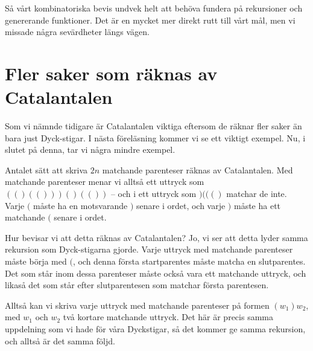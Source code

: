\documentclass{tufte-handout}
\begin{document}
Så vårt kombinatoriska bevis undvek helt att behöva fundera på rekursioner och genererande funktioner. Det är en mycket mer direkt rutt till vårt mål, men vi missade några sevärdheter längs vägen.

\section{Fler saker som räknas av Catalantalen}

Som vi nämnde tidigare är Catalantalen viktiga eftersom de räknar fler saker än bara just Dyck-stigar. I nästa föreläsning kommer vi se ett viktigt exempel. Nu, i slutet på denna, tar vi några mindre exempel.

\begin{example}
    Antalet sätt att skriva $2n$ matchande parenteser räknas av Catalantalen. Med matchande parenteser menar vi alltså ett uttryck som $(()(()))()(())$ -- och i ett uttryck som $)((()$ matchar de inte. Varje $($ måste ha en motsvarande $)$ senare i ordet, och varje $)$ måste ha ett matchande $($ senare i ordet.

    Hur bevisar vi att detta räknas av Catalantalen? Jo, vi ser att detta lyder samma rekursion som Dyck-stigarna gjorde. Varje uttryck med matchande parenteser måste börja med $($, och denna första startparentes måste matcha en slutparentes. Det som står inom dessa parenteser måste också vara ett matchande uttryck, och likaså det som står efter slutparentesen som matchar första parentesen.

    Alltså kan vi skriva varje uttryck med matchande parenteser på formen $(w_1)w_2$, med $w_1$ och $w_2$ två kortare matchande uttryck. Det här är precis samma uppdelning som vi hade för våra Dyckstigar, så det kommer ge samma rekursion, och alltså är det samma följd.
\end{example}
\end{document}
